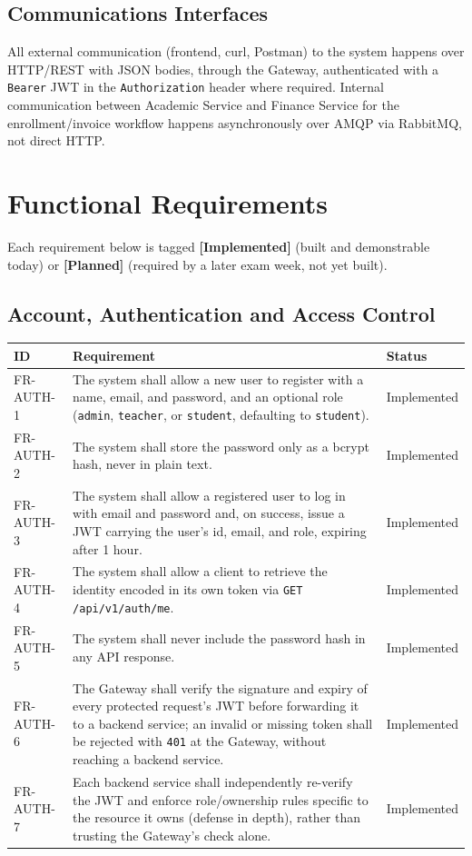 \documentclass[11pt,a4paper]{report}
\begin{document}
\subsection{Communications Interfaces}
All external communication (frontend, curl, Postman) to the system happens
over HTTP/REST with JSON bodies, through the Gateway, authenticated with a
\texttt{Bearer} JWT in the \texttt{Authorization} header where required.
Internal communication between Academic Service and Finance Service for the
enrollment/invoice workflow happens asynchronously over AMQP via RabbitMQ,
not direct HTTP.

\section{Functional Requirements}

Each requirement below is tagged \textbf{[Implemented]} (built and
demonstrable today) or \textbf{[Planned]} (required by a later exam week,
not yet built).

\subsection{Account, Authentication and Access Control}
\begin{longtable}{p{1.9cm} L{10.3cm} p{2.1cm}}
\toprule
\textbf{ID} & \textbf{Requirement} & \textbf{Status} \\
\midrule
\endhead
FR-AUTH-1 & The system shall allow a new user to register with a name, email, and password, and an optional role (\texttt{admin}, \texttt{teacher}, or \texttt{student}, defaulting to \texttt{student}). & Implemented \\
FR-AUTH-2 & The system shall store the password only as a bcrypt hash, never in plain text. & Implemented \\
FR-AUTH-3 & The system shall allow a registered user to log in with email and password and, on success, issue a JWT carrying the user's id, email, and role, expiring after 1 hour. & Implemented \\
FR-AUTH-4 & The system shall allow a client to retrieve the identity encoded in its own token via \texttt{GET /api/v1/auth/me}. & Implemented \\
FR-AUTH-5 & The system shall never include the password hash in any API response. & Implemented \\
FR-AUTH-6 & The Gateway shall verify the signature and expiry of every protected request's JWT before forwarding it to a backend service; an invalid or missing token shall be rejected with \texttt{401} at the Gateway, without reaching a backend service. & Implemented \\
FR-AUTH-7 & Each backend service shall independently re-verify the JWT and enforce role/ownership rules specific to the resource it owns (defense in depth), rather than trusting the Gateway's check alone. & Implemented \\
\bottomrule
\end{longtable}
\end{document}
